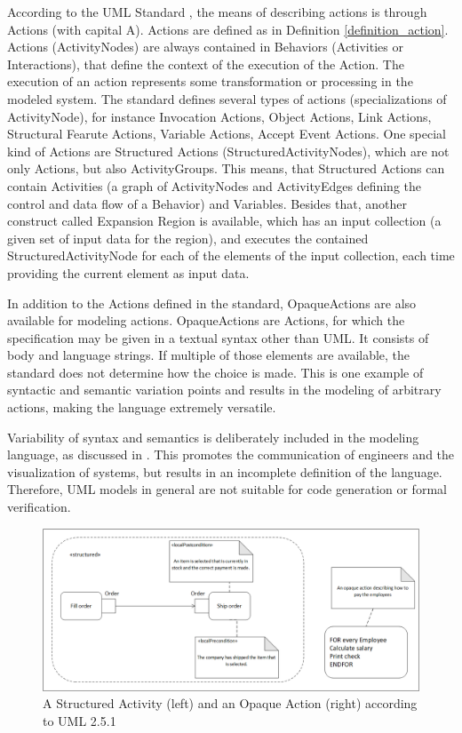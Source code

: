 According to the UML Standard \cite{UMLStandard251}, the means of describing actions is through Actions (with capital A). Actions are defined as in Definition \ref{definition_action}. Actions (ActivityNodes) are always contained in Behaviors (Activities or Interactions), that define the context of the execution of the Action. The execution of an action represents some transformation or processing in the modeled system. The standard defines several types of actions (specializations of ActivityNode), for instance Invocation Actions, Object Actions, Link Actions, Structural Fearute Actions, Variable Actions, Accept Event Actions. One special kind of Actions are Structured Actions (StructuredActivityNodes), which are not only Actions, but also ActivityGroups. This means, that Structured Actions can contain Activities (a graph of ActivityNodes and ActivityEdges defining the control and data flow of a Behavior) and Variables. Besides that, another construct called Expansion Region is available, which has an input collection (a given set of input data for the region), and executes the contained StructuredActivityNode for each of the elements of the input collection, each time providing the current element as input data.

In addition to the Actions defined in the standard, OpaqueActions are also available for modeling actions. OpaqueActions are Actions, for which the specification may be given in a textual syntax other than UML. It consists of body and language strings. If multiple of those elements are available, the standard does not determine how the choice is made. This is one example of syntactic and semantic variation points and results in the modeling of arbitrary actions, making the language extremely versatile.

Variability of syntax and semantics is deliberately included in the modeling language, as discussed in \cite{VariabilityInModelingLanguages}. This promotes the communication of engineers and the visualization of systems, but results in an incomplete definition of the language. Therefore, UML models in general are not suitable for code generation or formal verification. 

\begin{figure}[!ht]
	\centering
	\includegraphics[width=150mm, keepaspectratio]{figures/UMLAction.png}
	\caption{A Structured Activity (left) and an Opaque Action (right) according to UML 2.5.1}
	\label{fig:UMLAction}
\end{figure}

